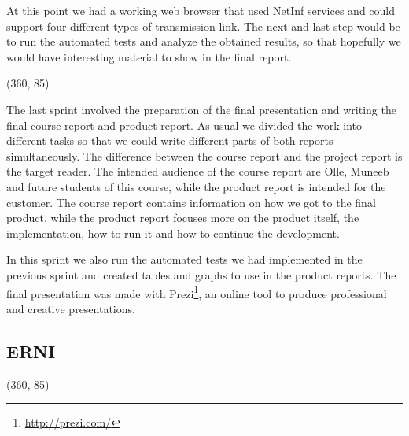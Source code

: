 At this point we had a working web browser that used NetInf services and could support four different types of transmission link.
The next and last step would be to run the automated tests and analyze the obtained results, so that hopefully we would have interesting material
to show in the final report.

\framebox(360, 85){
}

The last sprint involved the preparation of the final presentation and writing the final course report and
product report. As usual we divided the work into different tasks so that we could write different parts
of both reports simultaneously. The difference between the course report
and the project report is the target reader. The intended audience of the course report are Olle, Muneeb and future students
of this course, while the product report is intended for the customer. The course report contains information
on how we got to the final product, while the product report focuses more on the product itself, the implementation,
how to run it and how to continue the development.

In this sprint we also run the automated tests we had implemented in the previous sprint and created tables
and graphs to use in the product reports. The final presentation was made with Prezi\footnote{\url{http://prezi.com/}}, an online tool to produce professional and creative presentations.

\subsection {ERNI}

\framebox(360, 85){
}


